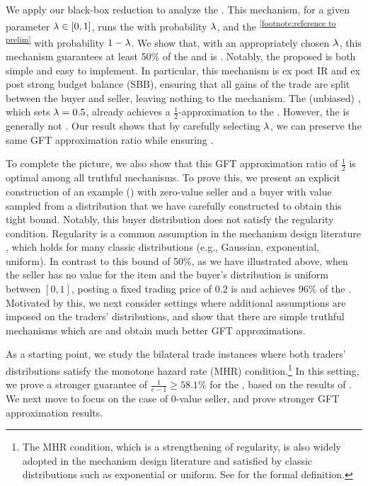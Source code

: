 We apply our black-box reduction to analyze the {\BiasedRandomOffer}. 
This mechanism, for a given parameter $\lambda\in[0,1]$, runs 
the {\SellerOffer} with probability $\lambda$, and the {\BuyerOffer}\textsuperscript{\ref{footnote:reference to prelim}} with probability $1 - \lambda$.
We show that, with an appropriately chosen 
$\lambda$, this mechanism guarantees at least 50\% of the {\SecondBest} and is {\ksfair}. Notably, the proposed {\BiasedRandomOffer} is both simple and easy to implement. 
In particular, this mechanism is ex post IR and ex post strong budget balance (SBB), ensuring that all gains of the trade are split between the buyer and seller, leaving nothing to the mechanism. The (unbiased) {\RandomOffer}, which sets $\lambda = 0.5$, already achieves a $\frac{1}{2}$-approximation to the {\SecondBest} \citep{BCWZ-17}. However, the {\RandomOffer} is generally not {\ksfair}. Our result shows that by carefully selecting $\lambda$, we can preserve the same GFT approximation ratio while ensuring {\ksfairness}. 

To complete the picture, we also show that this GFT approximation ratio of $\frac{1}{2}$ is optimal among all {\ksfair} truthful mechanisms. To {prove} 
this, we present an explicit construction of an example
() with
zero-value seller and a buyer with value sampled from a distribution that we have carefully constructed to obtain
this tight bound.
Notably, this buyer distribution does not satisfy the regularity condition.
Regularity is a common assumption in the mechanism design literature \citep{mye-81,BR-89}, which holds for many classic distributions (e.g., Gaussian, exponential, uniform). In contrast to this bound of 50\%, as we have illustrated above, when the seller has {no value for the item} 
and the buyer's distribution is uniform between $[0, 1]$, posting a fixed trading price of $0.2$ is {\ksfair} and achieves 96\% of the {\SecondBest}. Motivated by this, we next consider settings where additional assumptions are imposed on the traders' distributions, and show that there are simple truthful mechanisms which are {\ksfair} and obtain much better GFT approximations. 

As a starting point, we study the bilateral trade instances where both traders' distributions satisfy the monotone hazard rate (MHR) condition.\footnote{The MHR condition, which is a {strengthening} of regularity, is also widely adopted in the mechanism design literature and satisfied by classic distributions such as exponential or uniform. See  for the formal definition.} In this setting, we prove a stronger guarantee of $\frac{1}{e - 1} \geq 58.1\%$ for the {\ksfair} {\BiasedRandomOffer}, based on the results of \citep{Fei-22}. We next move to focus on the case of $0$-value seller, and prove stronger GFT approximation results.

